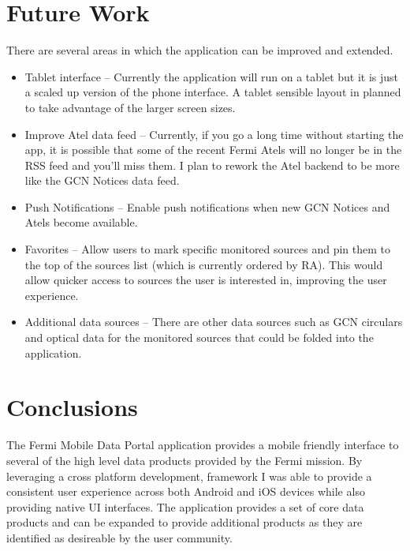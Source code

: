 \documentclass[11pt,twoside]{article}
\begin{document}
\section{Future Work}
There are several areas in which the application can be improved and extended. 
\begin{itemize}
\item{Tablet interface -- Currently the application will run on a tablet but it is just a scaled up version of the phone interface.  A tablet sensible layout in planned to take advantage of the larger screen sizes.}
\item{Improve Atel data feed -- Currently, if you go a long time without starting the app, it is possible that some of the recent Fermi Atels will no longer be in the RSS feed and you'll miss them.  I plan to rework the Atel backend to be more like the GCN Notices data feed.}
\item{Push Notifications -- Enable push notifications when new GCN Notices and Atels become available.}
\item{Favorites -- Allow users to mark specific monitored sources and pin them to the top of the sources list (which is currently ordered by RA). This would allow quicker access to sources the user is interested in, improving the user experience.}
\item{Additional data sources -- There are other data sources such as GCN circulars and optical data for the monitored sources that could be folded into the application.}
\end{itemize}

\section{Conclusions}
The Fermi Mobile Data Portal application provides a mobile friendly interface to several of the high level data products provided by the Fermi mission.  By leveraging a cross platform development, framework I was able to provide a consistent user experience across both Android and iOS devices while also providing native UI interfaces.  The application provides a set of core data products and can be expanded to provide additional products as they are identified as desireable by the user community.

%
\end{document}
